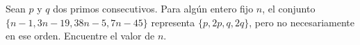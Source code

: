 Sean $p$ y $q$ dos primos consecutivos. Para algún entero fijo $n$, el conjunto $\{n-1,3n-19,38n-5,7n-45\}$ representa $\{p,2p,q,2q\}$, pero no necesariamente en ese orden. Encuentre el valor de $n$.